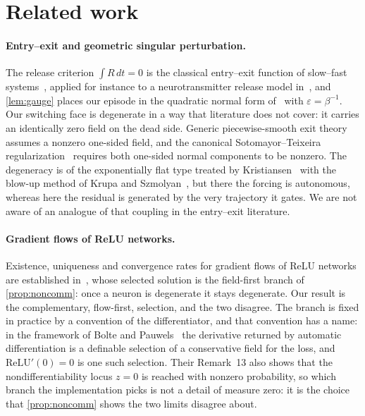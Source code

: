 \documentclass[11pt]{article}
\theoremstyle{definition}
\theoremstyle{remark}
\begin{document}
\section{Related work}\label{sec:related}

\paragraph{Entry--exit and geometric singular perturbation.}
The release criterion $\int R\,dt=0$ is the classical entry--exit function of
slow--fast systems~\cite[Theorem 1.1]{DMS16}, applied for instance to a
neurotransmitter release model in~\cite{SDR23}, and \cref{lem:gauge} places our
episode in the quadratic normal form of~\cite[equations~(1.9)--(1.10)]{DMS16} with
$\varepsilon=\beta^{-1}$. Our switching face is degenerate in a way that
literature does not cover: it carries an identically zero field on the dead side.
Generic piecewise-smooth exit theory~\cite{Jef16,GH15,GH22} assumes a nonzero
one-sided field, and the canonical Sotomayor--Teixeira
regularization~\cite{ST98,LST07} requires both one-sided normal components to be
nonzero. The degeneracy is of the exponentially flat type treated by
Kristiansen~\cite{Kri17} with the blow-up method of Krupa and
Szmolyan~\cite{KS01}, but there the forcing is autonomous, whereas here the
residual is generated by the very trajectory it gates. We are not aware of an
analogue of that coupling in the entry--exit literature.

\paragraph{Gradient flows of ReLU networks.} Existence, uniqueness and
convergence rates for gradient flows of ReLU networks are established
in~\cite{EJRW23}, whose selected solution is the field-first branch of
\cref{prop:noncomm}: once a neuron is degenerate it stays degenerate. Our
result is the complementary, flow-first, selection, and the two disagree. The
branch is fixed in practice by a convention of the differentiator, and that
convention has a name: in the framework of Bolte and Pauwels~\cite{BP21} the
derivative returned by automatic differentiation is a definable selection of a
conservative field for the loss, and $\mathrm{ReLU}'(0)=0$ is one such
selection. Their Remark~13 also shows that the nondifferentiability locus
$z=0$ is reached with nonzero probability, so which branch the implementation
picks is not a detail of measure zero: it is the choice that
\cref{prop:noncomm} shows the two limits disagree about.
\end{document}
